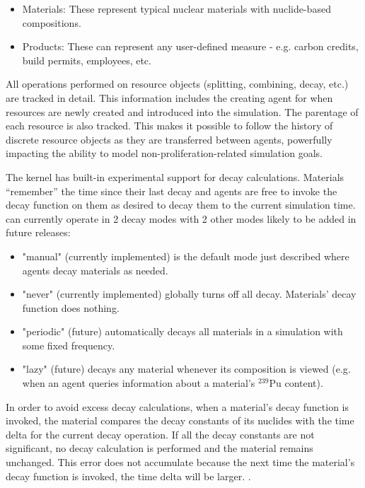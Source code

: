 \begin{itemize}

  \item Materials: These represent typical nuclear materials with
      nuclide-based compositions.

  \item Products: These can represent any user-defined measure - e.g. carbon
      credits, build permits, employees, etc.

\end{itemize}

All operations performed on resource objects (splitting, combining,
decay, etc.) are tracked in detail.  This information includes the creating
agent for when resources are newly created and introduced into the simulation.
The parentage of each resource is also tracked. This makes it possible to
follow the history of discrete resource objects as they are transferred
between agents, powerfully impacting the ability to model 
non-proliferation-related simulation goals. 

The \Cyclus kernel has built-in experimental support for decay calculations.
Materials ``remember'' the time since their last decay and agents are free to
invoke the decay function on them as desired to decay them to the current
simulation time. \Cyclus can currently operate in 2 decay modes with 2 other
modes likely to be added in future releases:

\begin{itemize}

    \item "manual" (currently implemented) is the default mode just described
        where agents decay materials as needed.

    \item "never" (currently implemented) globally turns off all decay.
        Materials' decay function does nothing.

    \item "periodic" (future) automatically decays all materials in a
        simulation with some fixed frequency.

    \item "lazy" (future) decays any material whenever its composition is
        viewed (e.g. when an agent queries information about a material's
        $^{239}$Pu content).

\end{itemize}

In order to avoid excess decay calculations, when a material's decay function
is invoked, the material compares the decay constants of its nuclides with
the time delta for the current
decay operation.  If all the decay constants are not significant, no decay
calculation is performed and the material remains unchanged.  This error does
not accumulate because the next time the material's decay function is invoked,
the time delta will be larger. 
.

